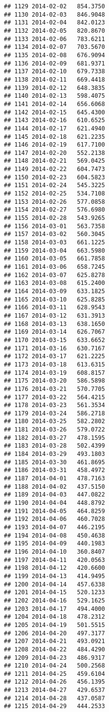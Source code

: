 \documentclass[
]{article}
\begin{document}
\begin{verbatim}
## 1129 2014-02-02   854.3750
## 1130 2014-02-03   846.9048
## 1131 2014-02-04   842.0123
## 1132 2014-02-05   820.8670
## 1133 2014-02-06   783.6211
## 1134 2014-02-07   703.5670
## 1135 2014-02-08   676.9094
## 1136 2014-02-09   681.9371
## 1137 2014-02-10   679.7338
## 1138 2014-02-11   669.4418
## 1139 2014-02-12   648.3835
## 1140 2014-02-13   598.4075
## 1141 2014-02-14   656.6068
## 1142 2014-02-15   645.4300
## 1143 2014-02-16   610.6525
## 1144 2014-02-17   621.4940
## 1145 2014-02-18   621.2235
## 1146 2014-02-19   617.7100
## 1147 2014-02-20   552.2138
## 1148 2014-02-21   569.0425
## 1149 2014-02-22   604.7473
## 1150 2014-02-23   604.5823
## 1151 2014-02-24   545.3225
## 1152 2014-02-25   534.7108
## 1153 2014-02-26   577.0858
## 1154 2014-02-27   576.6980
## 1155 2014-02-28   543.9265
## 1156 2014-03-01   563.7358
## 1157 2014-03-02   560.3045
## 1158 2014-03-03   661.1225
## 1159 2014-03-04   663.5980
## 1160 2014-03-05   661.7858
## 1161 2014-03-06   658.7245
## 1162 2014-03-07   625.8278
## 1163 2014-03-08   615.2400
## 1164 2014-03-09   633.1825
## 1165 2014-03-10   625.8285
## 1166 2014-03-11   628.9543
## 1167 2014-03-12   631.3913
## 1168 2014-03-13   638.1650
## 1169 2014-03-14   626.7067
## 1170 2014-03-15   633.6652
## 1171 2014-03-16   630.7167
## 1172 2014-03-17   621.2225
## 1173 2014-03-18   613.6315
## 1174 2014-03-19   608.8157
## 1175 2014-03-20   586.5898
## 1176 2014-03-21   570.7705
## 1177 2014-03-22   564.4215
## 1178 2014-03-23   561.3534
## 1179 2014-03-24   586.2718
## 1180 2014-03-25   582.2802
## 1181 2014-03-26   579.0722
## 1182 2014-03-27   478.1595
## 1183 2014-03-28   502.4399
## 1184 2014-03-29   493.1803
## 1185 2014-03-30   461.8695
## 1186 2014-03-31   458.4972
## 1187 2014-04-01   478.7163
## 1188 2014-04-02   437.5150
## 1189 2014-04-03   447.0822
## 1190 2014-04-04   448.8792
## 1191 2014-04-05   464.8259
## 1192 2014-04-06   460.7028
## 1193 2014-04-07   446.2195
## 1194 2014-04-08   450.4638
## 1195 2014-04-09   440.1983
## 1196 2014-04-10   360.8407
## 1197 2014-04-11   420.0563
## 1198 2014-04-12   420.6600
## 1199 2014-04-13   414.9495
## 1200 2014-04-14   457.6338
## 1201 2014-04-15   520.1233
## 1202 2014-04-16   529.1625
## 1203 2014-04-17   494.4000
## 1204 2014-04-18   478.2312
## 1205 2014-04-19   501.5515
## 1206 2014-04-20   497.3177
## 1207 2014-04-21   493.0921
## 1208 2014-04-22   484.4290
## 1209 2014-04-23   486.9317
## 1210 2014-04-24   500.2568
## 1211 2014-04-25   459.6104
## 1212 2014-04-26   456.1395
## 1213 2014-04-27   429.6537
## 1214 2014-04-28   437.0587
## 1215 2014-04-29   444.2533

\end{verbatim}
\end{document}
